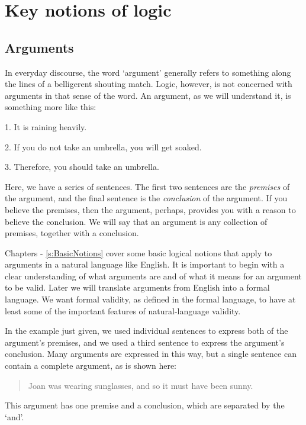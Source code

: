 \part{Key notions of logic}
\label{ch.intro}


\chapter{Arguments}
\label{s:Arguments}

In everyday discourse, the word `argument' generally refers to something along the lines of a belligerent shouting match. Logic, however, is not concerned with arguments in that sense of the word. An argument, as we will understand it, is something more like this:
	\begin{earg}\label{argRaining}
		\item[1.] It is raining heavily.
		\item[2.] If you do not take an umbrella, you will get soaked.
		\item[3.] Therefore, you should take an umbrella.
	\end{earg}
Here, we have a series of sentences. The first two sentences are the \emph{premises} of the argument, and the final sentence is the \emph{conclusion} of the argument. If you believe the premises, then the argument, perhaps, provides you with a reason to believe the conclusion. We will say that an argument is any collection of premises, together with a conclusion. 

Chapters \ref{ch.intro} - \ref{s:BasicNotions} cover some basic logical notions that apply to arguments in a natural language like English. It is important to begin with a clear understanding of what arguments are and of what it means for an argument to be valid. Later we will translate arguments from English into a formal language. We want formal validity, as defined in the formal language, to have at least some of the important features of natural-language validity.

In the example just given, we used individual sentences to express both of the argument's premises, and we used a third sentence to express the argument's conclusion. Many arguments are expressed in this way, but a single sentence can contain a complete argument, as is shown here:
	\begin{quote}
		 Joan was wearing sunglasses, and so it must have been sunny.
	\end{quote}
This argument has one premise and a conclusion, which are separated by the `and'.

